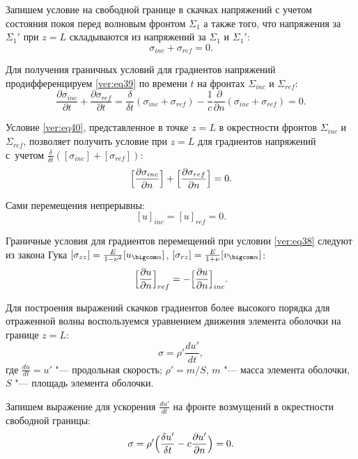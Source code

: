 Запишем условие на свободной границе в скачках напряжений с учетом состояния покоя перед волновым фронтом $\Sigma_1$ а также того, что напряжения за $\Sigma_1'$ при $z=L$ складываются из напряжений за $\Sigma_1$ и $\Sigma_1'$:
\begin{equation}
\label{ver:eq39}
\sigma_{inc}+\sigma_{ref}=0.
\end{equation}

Для получения граничных условий для градиентов напряжений продифференцируем \eqref{ver:eq39} по времени $t$ на фронтах $\Sigma_{inc}$ и $\Sigma_{ref}$:
\begin{equation}
\label{ver:eq40}
\frac{\partial\sigma_{inc}}{\partial t}+\frac{\partial\sigma_{ref}}{\partial t}=\frac{\delta}{\delta t} (\sigma_{inc}+\sigma_{ref}) -\frac{1}{c}\frac{\partial}{\partial n}(\sigma_{inc}+\sigma_{ref})=0.
\end{equation}

Условие \eqref{ver:eq40}, представленное в точке $z=L$ в окрестности фронтов $\Sigma_{inc}$ и $\Sigma_{ref}$, позволяет получить условие при $z=L$ для градиентов напряжений с~учетом $\frac{\delta}{\delta t}([\sigma_{inc}]+[\sigma_{ref}])$:
\begin{equation}
\label{ver:eq41}
\Bigl[\frac{\partial \sigma_{inc}}{\partial n}\Bigr]+
\Bigl[\frac{\partial \sigma_{ref}}{\partial n}\Bigr]=0.
\end{equation}

Сами перемещения непрерывны: $$[u]_{inc}=[u]_{ref}=0.$$

Граничные условия для градиентов перемещений при условии \eqref{ver:eq38} следуют из закона Гука $[\sigma_{zz}]=\frac{E}{1-\nu^2}[u_{\bigcom n}]$, $[\sigma_{rz}]=\frac{E}{1+\nu}[v_{\bigcom n}]$:
\begin{equation}
\label{ver:eq42}
\Bigl[\frac{\partial u}{\partial n}\Bigr]_{ref}=-\Bigl[\frac{\partial u}{\partial n}\Bigr]_{inc}.
\end{equation}

Для построения выражений скачков градиентов более высокого порядка для отраженной волны воспользуемся уравнением движения элемента оболочки на границе $z=L$:
\begin{equation}
\label{ver:eq43}
\sigma=\rho'\frac{du'}{dt},
\end{equation}
где $\frac{du}{dt}=u'$ "--- продольная скорость;  $\rho'=m/S$, $m$ "--- масса элемента оболочки, $S$ "--- площадь элемента оболочки.

Запишем выражение для ускорения $\frac{du'}{dt}$ на фронте возмущений в окрестности свободной границы:
\begin{equation}
\label{ver:eq44}
\sigma=\rho'\Bigl(\frac{\delta u'}{\delta t}-c\frac{\partial u'}{\partial n}\Bigr)=0.
\end{equation}

